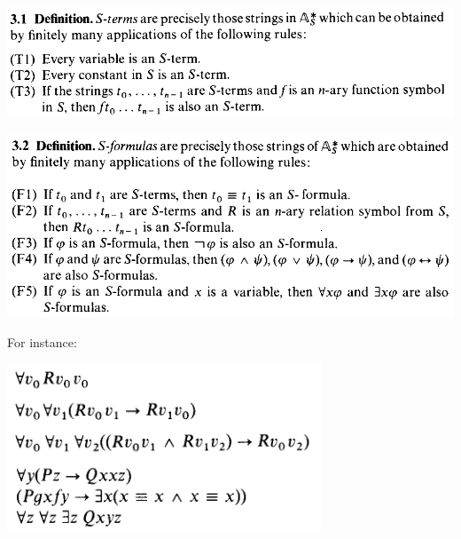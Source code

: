 \documentclass[10pt,a4paper]{article}
\begin{document}
		\begin{center}
		\includegraphics[scale=.5]{31}
		\end{center}

		\begin{center}
		\includegraphics[scale=.5]{32}
		\end{center}

		For instance:

		\begin{center}
		\includegraphics[scale=1]{exemplos}
		\end{center}
\end{document}
